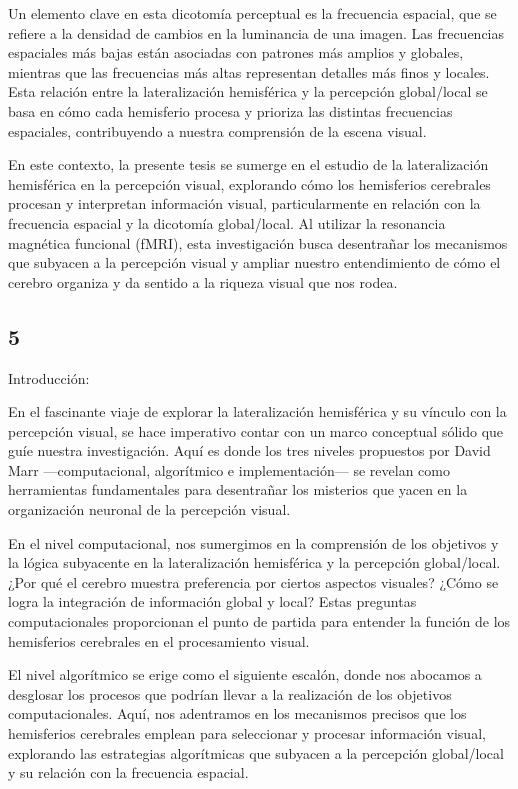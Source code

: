 \documentclass{article}
\begin{document}
	Un elemento clave en esta dicotomía perceptual es la frecuencia espacial, que se refiere a la densidad de cambios en la luminancia de una imagen. Las frecuencias espaciales más bajas están asociadas con patrones más amplios y globales, mientras que las frecuencias más altas representan detalles más finos y locales. Esta relación entre la lateralización hemisférica y la percepción global/local se basa en cómo cada hemisferio procesa y prioriza las distintas frecuencias espaciales, contribuyendo a nuestra comprensión de la escena visual.
	
	En este contexto, la presente tesis se sumerge en el estudio de la lateralización hemisférica en la percepción visual, explorando cómo los hemisferios cerebrales procesan y interpretan información visual, particularmente en relación con la frecuencia espacial y la dicotomía global/local. Al utilizar la resonancia magnética funcional (fMRI), esta investigación busca desentrañar los mecanismos que subyacen a la percepción visual y ampliar nuestro entendimiento de cómo el cerebro organiza y da sentido a la riqueza visual que nos rodea.
	
	\subsection{5}
	
	Introducción:
	
	En el fascinante viaje de explorar la lateralización hemisférica y su vínculo con la percepción visual, se hace imperativo contar con un marco conceptual sólido que guíe nuestra investigación. Aquí es donde los tres niveles propuestos por David Marr —computacional, algorítmico e implementación— se revelan como herramientas fundamentales para desentrañar los misterios que yacen en la organización neuronal de la percepción visual.
	
	En el nivel computacional, nos sumergimos en la comprensión de los objetivos y la lógica subyacente en la lateralización hemisférica y la percepción global/local. ¿Por qué el cerebro muestra preferencia por ciertos aspectos visuales? ¿Cómo se logra la integración de información global y local? Estas preguntas computacionales proporcionan el punto de partida para entender la función de los hemisferios cerebrales en el procesamiento visual.
	
	El nivel algorítmico se erige como el siguiente escalón, donde nos abocamos a desglosar los procesos que podrían llevar a la realización de los objetivos computacionales. Aquí, nos adentramos en los mecanismos precisos que los hemisferios cerebrales emplean para seleccionar y procesar información visual, explorando las estrategias algorítmicas que subyacen a la percepción global/local y su relación con la frecuencia espacial.
	
\end{document}
